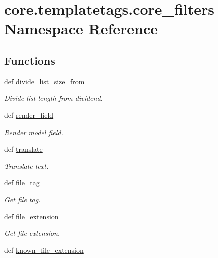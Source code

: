 \hypertarget{namespacecore_1_1templatetags_1_1core__filters}{\section{core.\-templatetags.\-core\-\_\-filters Namespace Reference}
\label{namespacecore_1_1templatetags_1_1core__filters}
}
\subsection*{Functions}
\begin{DoxyCompactItemize}
\item 
def \hyperlink{namespacecore_1_1templatetags_1_1core__filters_ad8d36c84043562694dcbd886ded97df7}{divide\-\_\-list\-\_\-size\-\_\-from}
\begin{DoxyCompactList}\small\item\em Divide list length from dividend. \end{DoxyCompactList}\item 
def \hyperlink{namespacecore_1_1templatetags_1_1core__filters_a0bf3a514eabd6d8710f9851ec2854a34}{render\-\_\-field}
\begin{DoxyCompactList}\small\item\em Render model field. \end{DoxyCompactList}\item 
def \hyperlink{namespacecore_1_1templatetags_1_1core__filters_afae365997d7283054835ac5a6c0bfd2a}{translate}
\begin{DoxyCompactList}\small\item\em Translate text. \end{DoxyCompactList}\item 
def \hyperlink{namespacecore_1_1templatetags_1_1core__filters_a13fbb41cbc03810ef105836cf5fba952}{file\-\_\-tag}
\begin{DoxyCompactList}\small\item\em Get file tag. \end{DoxyCompactList}\item 
def \hyperlink{namespacecore_1_1templatetags_1_1core__filters_a9230dbdb1e3ab13961a252577e232fb2}{file\-\_\-extension}
\begin{DoxyCompactList}\small\item\em Get file extension. \end{DoxyCompactList}\item 
def \hyperlink{namespacecore_1_1templatetags_1_1core__filters_a5ae1903881115c681923c5e86d4b5b44}{known\-\_\-file\-\_\-extension}

\end{DoxyCompactItemize}
